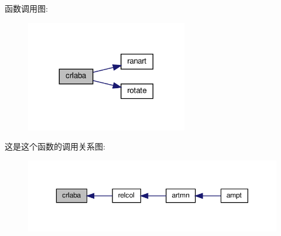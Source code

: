 函数调用图\+:
\nopagebreak
\begin{figure}[H]
\begin{center}
\leavevmode
\includegraphics[width=200pt]{crlaba_8f90_af988ecb78f47119554e7033745f448bd_cgraph}
\end{center}
\end{figure}
这是这个函数的调用关系图\+:
\nopagebreak
\begin{figure}[H]
\begin{center}
\leavevmode
\includegraphics[width=350pt]{crlaba_8f90_af988ecb78f47119554e7033745f448bd_icgraph}
\end{center}
\end{figure}
